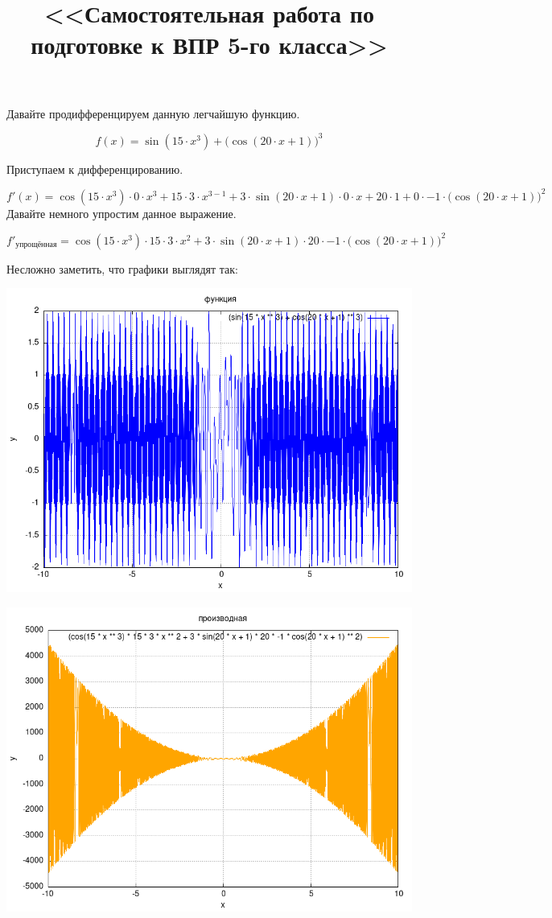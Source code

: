 \documentclass[12pt,a4paper]{extreport}
\title{<<Самостоятельная работа по подготовке к ВПР 5-го класса>>}
\begin{document}
\maketitle
\pagebreak


Давайте продифференцируем данную легчайшую функцию.

\begin{equation*}
f(x) = \sin(15 \cdot {x}^{3}) + ({\cos(20 \cdot x + 1))}^{3}
\end{equation*}


Приступаем к дифференцированию.

\begin{equation*}
f'(x) = \cos(15 \cdot {x}^{3}) \cdot 0 \cdot {x}^{3} + 15 \cdot 3 \cdot {x}^{3 - 1} + 3 \cdot \sin(20 \cdot x + 1) \cdot 0 \cdot x + 20 \cdot 1 + 0 \cdot -1 \cdot ({\cos(20 \cdot x + 1))}^{2}
\end{equation*}
Давайте немного упростим данное выражение.

\begin{equation*}
f'_{\text{упрощённая}} = \cos(15 \cdot {x}^{3}) \cdot 15 \cdot 3 \cdot {x}^{2} + 3 \cdot \sin(20 \cdot x + 1) \cdot 20 \cdot -1 \cdot ({\cos(20 \cdot x + 1))}^{2}
\end{equation*}


Несложно заметить, что графики выглядят так:

\begin{minipage}{0.45\textwidth}
\centering\includegraphics[width=\linewidth]{orig_plot.png}\end{minipage}
\hfill
\begin{minipage}{0.45\textwidth}
\centering\includegraphics[width=\linewidth]{optimized_plot.png}\end{minipage}
\end{document}
